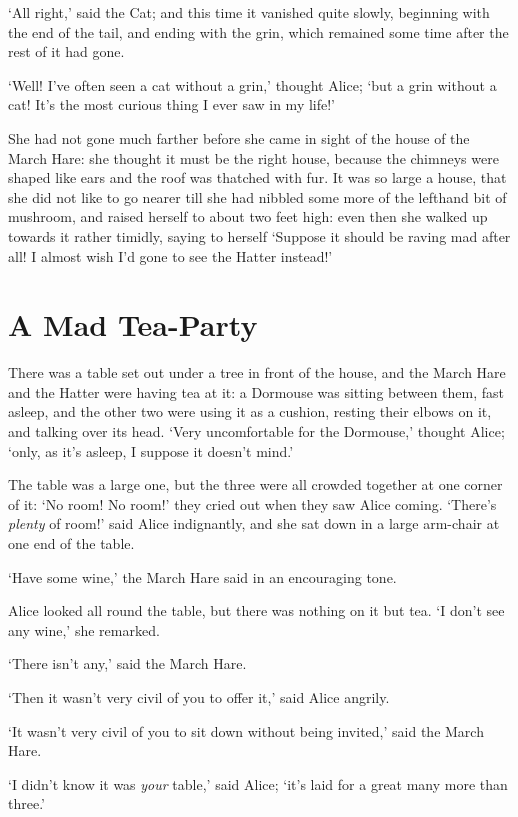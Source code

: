 \documentclass[12pt,openany]{memoir}
\begin{document}
`All right,' said the Cat; and this time it vanished quite slowly, beginning with the end of the tail, and ending with the grin, which remained some time after the rest of it had gone.

`Well! I've often seen a cat without a grin,' thought Alice; `but a grin without a cat! It's the most curious thing I ever saw in my life!'

She had not gone much farther before she came in sight of the house of the March Hare: she thought it must be the right house, because the chimneys were shaped like ears and the roof was thatched with fur. It was so large a house, that she did not like to go nearer till she had nibbled some more of the lefthand bit of mushroom, and raised herself to about two feet high: even then she walked up towards it rather timidly, saying to herself `Suppose it should be raving mad after all! I almost wish I'd gone to see the Hatter instead!'


\chapter{A Mad Tea-Party}

There was a table set out under a tree in front of the house, and the March Hare and the Hatter were having tea at it: a Dormouse was sitting between them, fast asleep, and the other two were using it as a cushion, resting their elbows on it, and talking over its head. `Very uncomfortable for the Dormouse,' thought Alice; `only, as it's asleep, I suppose it doesn't mind.'

The table was a large one, but the three were all crowded together at one corner of it: `No room! No room!' they cried out when they saw Alice coming. `There's \textit{plenty} of room!' said Alice indignantly, and she sat down in a large arm-chair at one end of the table.

`Have some wine,' the March Hare said in an encouraging tone.

Alice looked all round the table, but there was nothing on it but tea. `I don't see any wine,' she remarked.

`There isn't any,' said the March Hare.

`Then it wasn't very civil of you to offer it,' said Alice angrily.

`It wasn't very civil of you to sit down without being invited,' said the March Hare.

`I didn't know it was \textit{your} table,' said Alice; `it's laid for a great many more than three.'
\end{document}
